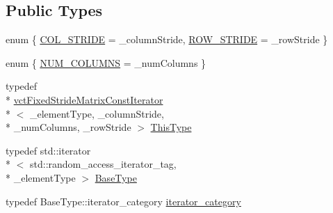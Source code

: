 \subsection*{Public Types}
\begin{DoxyCompactItemize}
\item 
enum \{ \hyperlink{classvct_fixed_stride_matrix_const_iterator_a1450ce9893d7c94450455553be9301c7a6321f5a6143e3e2aaf22f5e7e2f122cb}{C\-O\-L\-\_\-\-S\-T\-R\-I\-D\-E} = \-\_\-column\-Stride, 
\hyperlink{classvct_fixed_stride_matrix_const_iterator_a1450ce9893d7c94450455553be9301c7a8c8f6befb5bdf8e0e6e56185719c40dd}{R\-O\-W\-\_\-\-S\-T\-R\-I\-D\-E} = \-\_\-row\-Stride
 \}
\item 
enum \{ \hyperlink{classvct_fixed_stride_matrix_const_iterator_aa3bb07c9470b580a2b850046d65716b0a521c9c859f1aef445dbbbb695bec6563}{N\-U\-M\-\_\-\-C\-O\-L\-U\-M\-N\-S} = \-\_\-num\-Columns
 \}
\item 
typedef \\*
\hyperlink{classvct_fixed_stride_matrix_const_iterator}{vct\-Fixed\-Stride\-Matrix\-Const\-Iterator}\\*
$<$ \-\_\-element\-Type, \-\_\-column\-Stride, \\*
\-\_\-num\-Columns, \-\_\-row\-Stride $>$ \hyperlink{classvct_fixed_stride_matrix_const_iterator_a8c6ee7d655fb71d647506c3964a18e2c}{This\-Type}
\item 
typedef std\-::iterator\\*
$<$ std\-::random\-\_\-access\-\_\-iterator\-\_\-tag, \\*
\-\_\-element\-Type $>$ \hyperlink{classvct_fixed_stride_matrix_const_iterator_a305e6edbe5e4e2560f9bf01d3079a118}{Base\-Type}
\item 
typedef Base\-Type\-::iterator\-\_\-category \hyperlink{classvct_fixed_stride_matrix_const_iterator_a31bfb3c59476ee6060ec1d08874c0419}{iterator\-\_\-category}
\end{DoxyCompactItemize}
